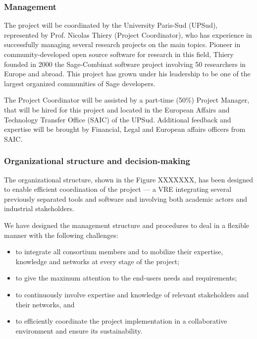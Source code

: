 \label{sect:mgt}

\subsubsection{Management}

The project will be coordinated by the University Paris-Sud (UPSud),
represented by Prof. Nicolas Thiery (Project Coordinator), who has
experience in successfully managing several research projects on the
main \TheProject topics.  Pioneer in community-developed open source
software for research in this field, Thiery founded in 2000 the
Sage-Combinat software project involving 50 researchers in Europe and
abroad.  This project has grown under his leadership to be one of the
largest organized communities of Sage developers.

The Project Coordinator will be assisted by a part-time (50\%) Project
Manager, that will be hired for this project and located in the
European Affairs and Technology Transfer Office (SAIC) of the UPSud.
Additional feedback and expertise will be brought by Financial, Legal
and European affairs officers from SAIC.

\subsubsection{Organizational structure and decision-making}


The organizational structure, shown in the Figure XXXXXXX, has been designed
to enable efficient coordination of the \TheProject project --- a VRE
integrating several previously separated tools and software and
involving both academic actors and industrial stakeholders.

We have designed the management structure and procedures to deal in a
flexible manner with the following challenges:

\begin{itemize}
\item to integrate all consortium members and to mobilize their
  expertise, knowledge and networks at every stage of the project;
\item to give the maximum attention to the end-users needs and
  requirements;
\item to continuously involve expertise and knowledge of relevant
  stakeholders and their networks, and
\item to efficiently coordinate the project implementation in a
  collaborative environment and ensure its sustainability.
\end{itemize}

